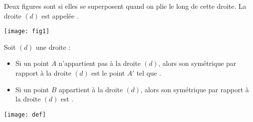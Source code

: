 \begin{mydef}
	Deux figures sont  si elles se superposent quand on plie le long de cette droite. 
	La droite $(d)$ est appelée .

\end{mydef}




\begin{myex}
	\begin{center}
		\texttt{[image: fig1]}
	\end{center}	
\end{myex}


	
	
	
	\begin{myprops}
		Soit $(d)$ une droite :
		\begin{itemize}
			\item Si un point $A$ n'appartient pas à la droite $(d)$, alors son symétrique par rapport à la droite $(d)$ est le point $A'$ tel que .
			\item Si un point $B$ appartient à la droite $(d)$, alors son symétrique par rapport à la droite $(d)$ est .
		\end{itemize}
	\end{myprops}
	
	\begin{center}
		\texttt{[image: def]}
	\end{center}

